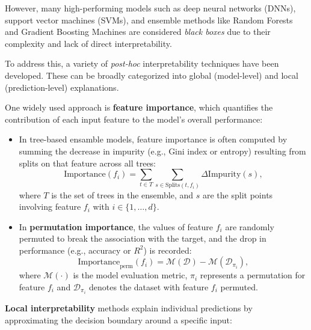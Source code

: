 However, many high-performing models such as deep neural networks (DNNs),
support vector machines (SVMs), and ensemble methods like Random Forests and
Gradient Boosting Machines are considered \emph{black boxes} due to their
complexity and lack of direct interpretability.

To address this, a variety of \emph{post-hoc} interpretability techniques have
been developed. These can be broadly categorized into global (model-level) and
local (prediction-level) explanations.

One widely used approach is \textbf{feature importance}, which quantifies the
contribution of each input feature to the model's overall performance:

\begin{itemize}
    \item In tree-based ensamble models, feature importance is often computed by summing
          the decrease in impurity (e.g., Gini index or entropy) resulting from splits on
          that feature across all trees: \begin{equation} \text{Importance}(f_i) =
              \sum_{t \in T} \sum_{s \in \text{Splits}(t, f_i)} \Delta \text{Impurity}(s),
          \end{equation}
          where $T$ is the set of trees in the ensemble, and $s$ are the split points
          involving feature $f_i$ with $i \in \{ 1, \ldots, d\}$.

    \item In \textbf{permutation importance}, the values of feature $f_i$ are randomly
          permuted to break the association with the target, and the drop in performance
          (e.g., accuracy or $R^2$) is recorded:
          \begin{equation} \text{Importance}_{\text{perm}}(f_i) =
              \mathcal{M}(\mathcal{D}) - \mathcal{M}(\mathcal{D}_{\pi_i}),
          \end{equation}
          where $\mathcal{M}(\cdot)$ is the model evaluation metric, $\pi_i$ represents a
          permutation for feature $f_i$ and
          $\mathcal{D}_{\pi_i}$ denotes the dataset with feature $f_i$ permuted.
\end{itemize}

\textbf{Local interpretability} methods explain individual predictions by approximating
the decision boundary around a specific input:

